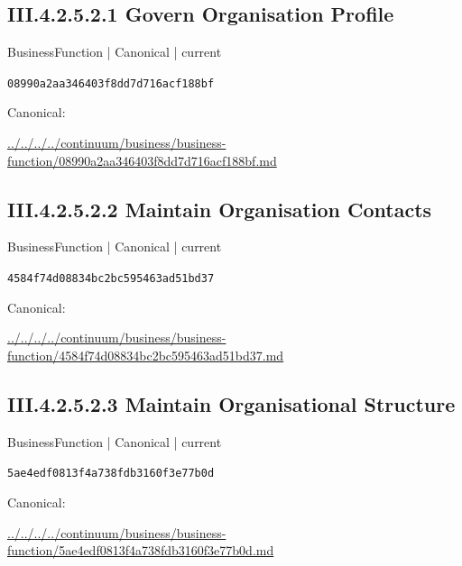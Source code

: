 \documentclass[10pt,a4paper]{article}
\begin{document}
\subsection*{III.4.2.5.2.1 Govern Organisation Profile}
\label{element-08990a2aa346403f8dd7d716acf188bf}
{\small BusinessFunction | Canonical | current}\par
\texttt{08990a2aa346403f8dd7d716acf188bf}\par
Canonical: \par
{\footnotesize\url{../../../../continuum/business/business-function/08990a2aa346403f8dd7d716acf188bf.md}}\par
\subsection*{III.4.2.5.2.2 Maintain Organisation Contacts}
\label{element-4584f74d08834bc2bc595463ad51bd37}
{\small BusinessFunction | Canonical | current}\par
\texttt{4584f74d08834bc2bc595463ad51bd37}\par
Canonical: \par
{\footnotesize\url{../../../../continuum/business/business-function/4584f74d08834bc2bc595463ad51bd37.md}}\par
\subsection*{III.4.2.5.2.3 Maintain Organisational Structure}
\label{element-5ae4edf0813f4a738fdb3160f3e77b0d}
{\small BusinessFunction | Canonical | current}\par
\texttt{5ae4edf0813f4a738fdb3160f3e77b0d}\par
Canonical: \par
{\footnotesize\url{../../../../continuum/business/business-function/5ae4edf0813f4a738fdb3160f3e77b0d.md}}\par
\end{document}
